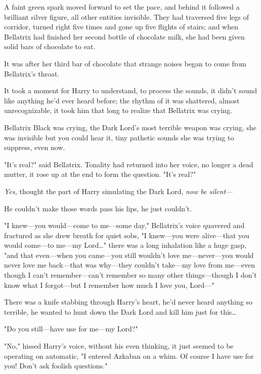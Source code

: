 
\lettrine{A}{} faint green
spark moved forward to set the pace, and behind it followed a brilliant silver
figure, all other entities invisible. They had traversed five legs of corridor,
turned right five times and gone up five flights of stairs; and when Bellatrix
had finished her second bottle of chocolate milk, she had been given solid bars
of chocolate to eat.

It was after her third bar of chocolate that strange noises began to come from
Bellatrix's throat.

It took a moment for Harry to understand, to process the sounds, it didn't
sound like anything he'd ever heard before; the rhythm of it was shattered,
almost unrecognizable, it took him that long to realize that Bellatrix was
crying.

Bellatrix Black was crying, the Dark Lord's most terrible weapon was crying,
she was invisible but you could hear it, tiny pathetic sounds she was trying to
suppress, even now.

"It's real?" said Bellatrix. Tonality had returned into her voice, no longer a
dead mutter, it rose up at the end to form the question. "It's real?"

\emph{Yes,} thought the part of Harry simulating the Dark Lord, \emph{now be
silent}---

He couldn't make those words pass his lips, he just couldn't.

"I knew---you would---come to me---some day," Bellatrix's voice quavered and
fractured as she drew breath for quiet sobs, "I knew---you were alive---that
you would come---to me---my Lord{\ldots}" there was a long inhalation like a
huge gasp, "and that even---when you came---you still wouldn't love
me---never---you would never love me back---that was why---they couldn't
take---my love from me---even though I can't remember---can't remember so many
other things---though I don't know what I forgot---but I remember how much I
love you, Lord---"

There was a knife stabbing through Harry's heart, he'd never heard anything so
terrible, he wanted to hunt down the Dark Lord and kill him just for
this{\ldots}

"Do you still---have use for me---my Lord?"

"No," hissed Harry's voice, without his even thinking, it just seemed to be
operating on automatic, "I entered Azkaban on a whim. Of course I have use for
you! Don't ask foolish questions."

